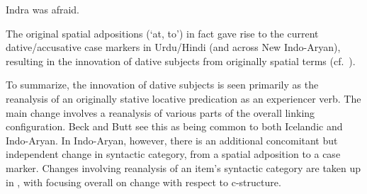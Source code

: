 \documentclass[output=paper,hidelinks]{langscibook}
\begin{document}


\ea Indra was afraid. \label{link:dat-subj}

 \hspace{1.1cm}
\z 


\noindent The original spatial adpositions (`at, to') in fact gave rise to the current dative/accusative case markers in Urdu/Hindi (and  across New Indo-Aryan), resulting in the innovation of dative subjects from originally spatial terms (cf.~\citealt{montaut03,buttahmed11}).  

To summarize, the innovation of dative subjects is seen primarily as the reanalysis of an originally stative locative predication as an experiencer verb. The main change involves a reanalysis of various parts of the overall linking configuration.  Beck and Butt see this as being common to both Icelandic and Indo-Aryan.  In Indo-Aryan, however, there is an additional concomitant but independent change in syntactic category, from a spatial adposition to a case marker. Changes involving reanalysis of an item's syntactic category are taken up in , with  focusing overall on change with respect to c-structure.
\end{document}
